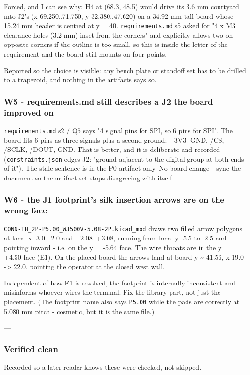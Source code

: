 \documentclass[11pt,a4paper]{article}
\begin{document}
Forced, and I can see why: H4 at (68.3, 48.5) would drive its 3.6 mm courtyard into J2's (x 69.250..71.750, y 32.380..47.620) on a 34.92 mm-tall board whose 15.24 mm header is centred at y = 40. \texttt{requirements.md} s5 asked for "4 x M3 clearance holes (3.2 mm) inset from the corners" and explicitly allows two on opposite corners if the outline is too small, so this is inside the letter of the requirement and the board still mounts on four points.

Reported so the choice is visible: any bench plate or standoff set has to be drilled to a trapezoid, and nothing in the artifacts says so.

\subsubsection*{W5 - requirements.md still describes a J2 the board improved on}
\texttt{requirements.md} s2 / Q6 says "4 signal pins for SPI, so 6 pins for SPI". The board fits 6 pins as three signals plus a second ground: +3V3, GND, /CS, /SCLK, /DOUT, GND. That is better, and it is deliberate and recorded (\texttt{constraints.json} edges J2: "ground adjacent to the digital group at both ends of it"). The stale sentence is in the P0 artifact only. No board change - sync the document so the artifact set stops disagreeing with itself.

\subsubsection*{W6 - the J1 footprint's silk insertion arrows are on the wrong face}
\texttt{CONN-TH\_2P-P5.00\_WJ500V-5.08-2P.kicad\_mod} draws two filled arrow polygons at local x -3.0..-2.0 and +2.08..+3.08, running from local y -5.5 to -2.5 and pointing inward - i.e. on the y = -5.64 face. The wire throats are in the y = +4.50 face (E1). On the placed board the arrows land at board y \textasciitilde{} 41.56, x 19.0 -\textgreater{} 22.0, pointing the operator at the closed west wall.

Independent of how E1 is resolved, the footprint is internally inconsistent and misinforms whoever wires the terminal. Fix the library part, not just the placement. (The footprint name also says \texttt{P5.00} while the pads are correctly at 5.080 mm pitch - cosmetic, but it is the same file.)

---

\subsubsection*{Verified clean}
Recorded so a later reader knows these were checked, not skipped.
\end{document}
